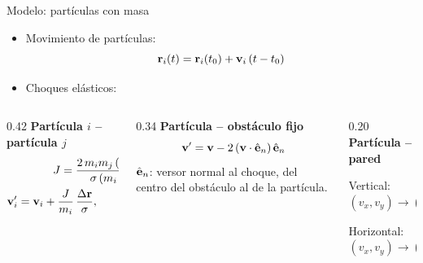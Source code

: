\documentclass[aspectratio=169]{beamer}
\begin{document}
\begin{frame}{Modelo: partículas con masa}
  \setlength{\jot}{1pt}
  \begin{itemize}\setlength{\itemsep}{0.3em}
    \item Movimiento de partículas:
      \[
        \mathbf{r}_i(t) = \mathbf{r}_i(t_0) + \mathbf{v}_i\,(t - t_0)
      \]
    \item Choques elásticos:
  \end{itemize}
  \small
  \setlength{\abovedisplayskip}{3pt}\setlength{\belowdisplayskip}{3pt}
  \setlength{\abovedisplayshortskip}{3pt}\setlength{\belowdisplayshortskip}{3pt}
  \begin{columns}[T,onlytextwidth]
    \begin{column}{0.42\textwidth}
      \textbf{Partícula $i$ -- partícula $j$}
      \begin{gather*}
        J = \frac{2\,m_i m_j\,(\Delta\mathbf{v}\cdot\Delta\mathbf{r})}{\sigma\,(m_i + m_j)}\\
        \mathbf{v}_i' = \mathbf{v}_i + \frac{J}{m_i}\,\frac{\Delta\mathbf{r}}{\sigma}, \qquad
        \mathbf{v}_j' = \mathbf{v}_j - \frac{J}{m_j}\,\frac{\Delta\mathbf{r}}{\sigma}
      \end{gather*}
    \end{column}
    \begin{column}{0.34\textwidth}
      \textbf{Partícula -- obstáculo fijo}
      \[
        \mathbf{v}' = \mathbf{v} - 2\,(\mathbf{v}\cdot\hat{\mathbf{e}}_n)\,\hat{\mathbf{e}}_n
      \]
      {\footnotesize $\hat{\mathbf{e}}_n$: versor normal al choque, del centro del obstáculo al
      de la partícula.}
    \end{column}
    \begin{column}{0.20\textwidth}
      \textbf{Partícula -- pared}\par\vspace{0.6em}
      Vertical:\\ $(v_x, v_y) \to (-v_x, v_y)$\par\vspace{0.5em}
      Horizontal:\\ $(v_x, v_y) \to (v_x, -v_y)$
    \end{column}
  \end{columns}
\end{frame}

\end{document}
